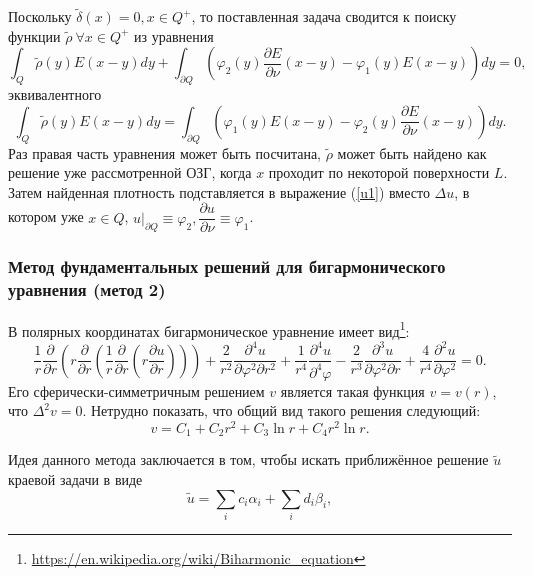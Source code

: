 \documentclass[a4paper]{article}
\newcommand{\der}[2]{\dfrac{\partial #1}{\partial #2}}
\begin{document}
Поскольку $\tilde{\delta}(x)=0, x \in Q^+$, то поставленная задача сводится к поиску функции $\tilde{\rho}\ \forall x \in Q^+$ из уравнения
\begin{equation}
  \int_Q \tilde{\rho}(y) E(x-y) dy + \int_{\partial Q} \left(\varphi_2(y)\der{E}{\nu}(x-y)-\varphi_1(y) E(x-y) \right) dy=0,
\end{equation}
эквивалентного
\begin{equation}
  \int_Q \tilde{\rho}(y) E(x-y) dy = \int_{\partial Q} \left(\varphi_1(y) E(x-y) -\varphi_2(y)\der{E}{\nu}(x-y)\right) dy.
  \label{bgogz}
\end{equation}
Раз правая часть уравнения может быть посчитана, $\tilde{\rho}$ может быть найдено как решение уже рассмотренной ОЗГ, когда $x$ проходит по некоторой поверхности $L$.
Затем найденная плотность подставляется в выражение (\ref{u1}) вместо $\Delta u$, в котором уже $x \in Q$, $u|_{\partial Q} \equiv \varphi_2, \der{u}{\nu} \equiv \varphi_1$.

\subsubsection{Метод фундаментальных решений для бигармонического уравнения (метод 2)}

В полярных координатах бигармоническое уравнение имеет вид\footnote{\url{https://en.wikipedia.org/wiki/Biharmonic_equation}}:
\begin{equation}
  \dfrac{1}{r} \dfrac{\partial}{\partial r} \left(r \dfrac{\partial}{\partial r} \left( \dfrac{1}{r} \dfrac{\partial}{\partial r} \left(r \dfrac{\partial u}{\partial r}   \right)  \right)    \right) + \dfrac{2}{r^2} \dfrac{\partial^4 u}{\partial \varphi^2 \partial r^2} +\dfrac{1}{r^4} \dfrac{\partial^4 u}{\partial^4 \varphi} - \dfrac{2}{r^3} \dfrac{\partial^3 u}{\partial \varphi^2 \partial r} + \dfrac{4}{r^4} \dfrac{\partial^2 u}{\partial \varphi^2}=0.
\end{equation}
Его сферически-симметричным решением $v$ является такая функция $v=v(r)$, что $\Delta^2 v=0$.
Нетрудно показать, что общий вид такого решения следующий:
\begin{equation*}
  v = C_1 + C_2 r^2 + C_3 \ln r + C_4 r^2 \ln r.
\end{equation*}

Идея данного метода заключается в том, чтобы искать приближённое решение $\tilde{u}$ краевой задачи в виде
\begin{equation*}
  \tilde{u} = \sum_i c_i \alpha_i + \sum_i d_i \beta_i,
\end{equation*}
\end{document}
